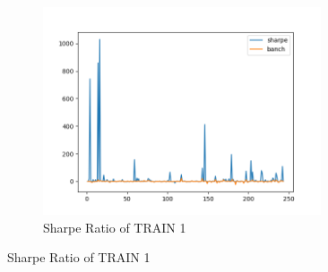 \begin{figure}[H]
\begin{subfigure}{.5\textwidth}
\includegraphics[clip, width=0.9\textwidth]{Graphics/trainPA00S.png} \caption{Sharpe Ratio of TRAIN 1}
\end{subfigure}%
\end{figure}

